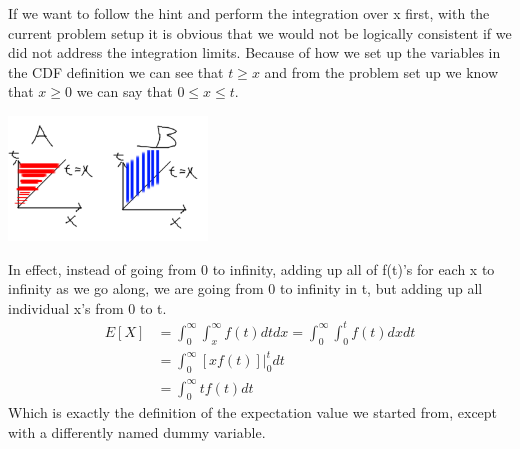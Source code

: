 \documentclass{article}
\newcommand{\1}{\mathbf{1}}
\begin{document}
If we want to follow the hint and perform the integration over x first, with the current problem setup it is obvious that we would not be logically consistent if we did not address the integration limits. Because of how we set up the variables in the CDF definition we can see that $t\geq x$ and from the problem set up we know that $x\geq 0$ we can say that $0\leq x \leq t$.
\begin{center}
\includegraphics[width=200px]{STATS509/HW3/picasso2.png}
\end{center}
In effect, instead of going from 0 to infinity, adding up all of f(t)'s for each x to infinity as we go along, we are going from 0 to infinity in t, but adding up all individual x's from 0 to t. 
\begin{align*}
    E[X] &=  \int_0^\infty\int_x^\infty f(t) dtdx  =  \int_0^\infty\int_0^t f(t) dxdt  \\
    &= \int_0^\infty \left[xf(t)\right]\big|_0^t dt \\
    &= \int_0^\infty tf(t) dt 
\end{align*}
Which is exactly the definition of the expectation value we started from, except with a differently named dummy variable.


	
\newpage
\end{document}
